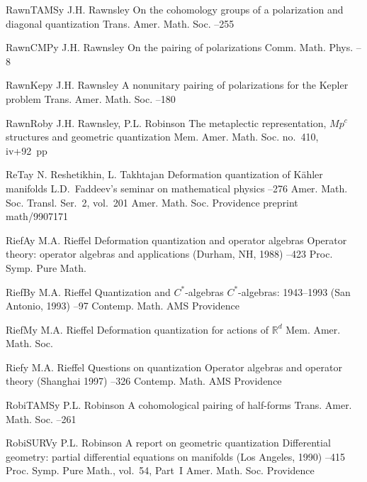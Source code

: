 \documentclass[12pt]{amsart}
\numberwithin{equation}{section}
\theoremstyle{remark}
\newcommand\RR{\mathbb R}
\newcommand{\by}{\mathbf y}
\begin{document}
\begin{thebibliography}{199}
 RawnTAMS\by{ J.H. Rawnsley \paper On the cohomology groups of a
polarization and diagonal quantization \jour Trans. Amer. Math. Soc. 
 --255}

 RawnCMP\by{ J.H. Rawnsley \paper On the pairing of polarizations \jour
Comm. Math. Phys.   --8}

 RawnKep\by{ J.H. Rawnsley \paper A nonunitary pairing of polarizations
for the Kepler problem \jour Trans. Amer. Math. Soc.   --180}

 RawnRob\by{ J.H. Rawnsley, P.L. Robinson \paper The metaplectic
representation, $Mp^c$ structures and geometric quantization \jour Mem. Amer.
Math. Soc.   \pages no.~410, iv+92~pp}

 ReTa\by{ N. Reshetikhin, L. Takhtajan \paper Deformation quantization
of K\"ahler manifolds \inbook L.D.~Faddeev's seminar on mathematical physics
--276 \bookinfo Amer. Math. Soc. Transl. Ser.~2, vol.~201 \publ Amer.
Math. Soc. \publaddr Providence  \paperinfo preprint math/9907171}

 RiefA\by{ M.A. Rieffel \paper Deformation quantization and operator
algebras \inbook Operator theory: operator algebras and applications (Durham,
NH, 1988) --423 \bookinfo Proc. Symp. Pure Math.  }

 RiefB\by{ M.A. Rieffel \paper Quantization and $C^*$-algebras \inbook
$C^*$-algebras: 1943--1993 (San Antonio, 1993) --97 \bookinfo Contemp.
Math.  \publ AMS \publaddr Providence }

 RiefM\by{ M.A. Rieffel \paper Deformation quantization for actions of
$\RR^d$ \jour Mem. Amer. Math. Soc.   }

 Rief\by{ M.A. Rieffel \paper Questions on quantization \inbook Operator
algebras and operator theory (Shanghai 1997) --326 \bookinfo Contemp.
Math.  \publ AMS \publaddr Providence }

 RobiTAMS\by{ P.L. Robinson \paper A cohomological pairing of half-forms
\jour Trans. Amer. Math. Soc.   --261}

 RobiSURV\by{ P.L. Robinson \paper A report on geometric quantization
\inbook Differential geometry: partial differential equations on manifolds
(Los Angeles, 1990) --415 \bookinfo Proc. Symp. Pure Math., vol.~54,
Part~I \publ Amer. Math. Soc. \publaddr Providence }


\end{thebibliography}
\end{document}
